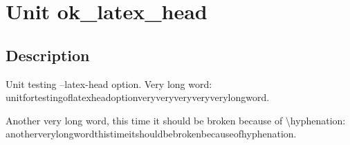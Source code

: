 \documentclass{report}
\begin{document}
\newlength{\tmplength}
\chapter{Unit ok{\_}latex{\_}head}
\section{Description}
Unit testing --latex{-}head option. Very long word: unitfortestingoflatexheadoptionveryveryveryveryverylongword.

Another very long word, this time it should be broken because of {\textbackslash}hyphenation: anotherverylongwordthistimeitshouldbebrokenbecauseofhyphenation.
\end{document}

